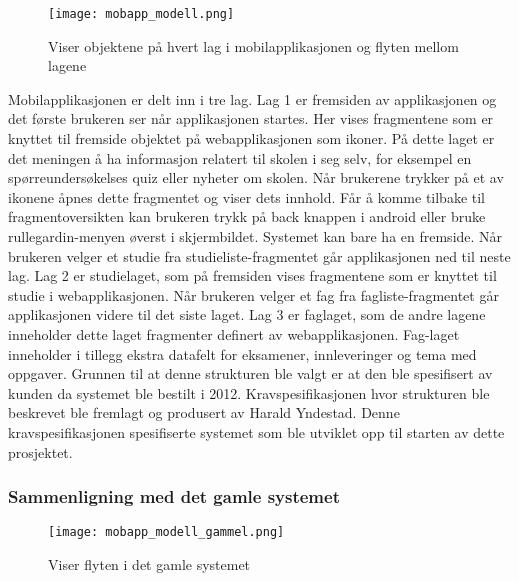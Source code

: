 \documentclass[../main.tex]{subfiles}
\begin{document}
\begin{figure}[H]
  \centering
  \texttt{[image: mobapp\_modell.png]}
  \caption{Viser objektene på hvert lag i mobilapplikasjonen og flyten mellom lagene}
\end{figure}

Mobilapplikasjonen er delt inn i tre lag. Lag 1 er fremsiden av applikasjonen og det første brukeren ser når applikasjonen startes. Her vises fragmentene som er knyttet til fremside objektet på webapplikasjonen som ikoner. På dette laget er det meningen å ha informasjon relatert til skolen i seg selv, for eksempel en spørreundersøkelses quiz eller nyheter om skolen. Når brukerene trykker på et av ikonene åpnes dette fragmentet og viser dets innhold. Får å komme tilbake til fragmentoversikten kan brukeren trykk på back knappen i android eller bruke rullegardin-menyen øverst i skjermbildet. Systemet kan bare ha en fremside.\newline
\newline
Når brukeren velger et studie fra studieliste-fragmentet går applikasjonen ned til neste lag. Lag 2 er studielaget, som på fremsiden vises fragmentene som er knyttet til studie i webapplikasjonen.\newline
\newline
Når brukeren velger et fag fra fagliste-fragmentet går applikasjonen videre til det siste laget. Lag 3 er faglaget, som de andre lagene inneholder dette laget fragmenter definert av webapplikasjonen. Fag-laget inneholder i tillegg ekstra datafelt for eksamener, innleveringer og tema med oppgaver.\newline
\newline
Grunnen til at denne strukturen ble valgt er at den ble spesifisert av kunden da systemet ble bestilt i 2012. Kravspesifikasjonen hvor strukturen ble beskrevet ble fremlagt og produsert av Harald Yndestad. Denne kravspesifikasjonen spesifiserte systemet som ble utviklet opp til starten av dette prosjektet.\newline

\subsubsection{Sammenligning med det gamle systemet}

\begin{figure}[H]
  \centering
  \texttt{[image: mobapp\_modell\_gammel.png]}
  \caption{Viser flyten i det gamle systemet}
\end{figure}
\end{document}
